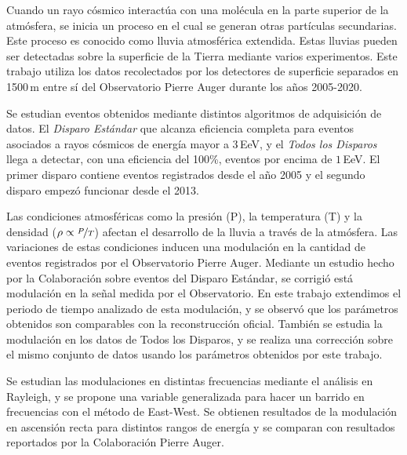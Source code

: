 \begin{resumen}%
Cuando un rayo cósmico interactúa con una molécula en la parte superior de la atmósfera, se inicia un proceso en el cual se generan otras partículas secundarias. Este proceso es conocido como lluvia atmosférica extendida. Estas lluvias pueden ser detectadas sobre la superficie de la Tierra mediante varios experimentos. Este trabajo utiliza los datos recolectados por los detectores de superficie separados en 1500\,m entre sí del Observatorio Pierre Auger durante los años 2005-2020. 

Se estudian eventos obtenidos mediante distintos algoritmos de adquisición de datos. El \emph{Disparo Estándar} que alcanza eficiencia completa para eventos asociados a rayos cósmicos de energía mayor a $3\,$EeV, y el \emph{Todos los Disparos} llega a detectar, con una eficiencia del 100\%, eventos por encima de $1\,$EeV. El primer disparo contiene eventos registrados desde el año 2005 y el segundo disparo empezó funcionar desde el 2013. 

Las condiciones atmosféricas como la presión (P), la temperatura (T) y la densidad ($\rho \propto \nicefrac{P}{T}$) afectan el desarrollo de la lluvia a través de la atmósfera. Las variaciones de estas condiciones inducen una modulación en la cantidad de eventos registrados por el Observatorio Pierre Auger. Mediante un estudio hecho por la Colaboración sobre eventos del Disparo Estándar, se corrigió está modulación en la señal medida por el Observatorio. En este trabajo extendimos el periodo de tiempo analizado de esta modulación, y se observó que los parámetros obtenidos son comparables con la reconstrucción oficial. También se estudia la modulación en los datos de Todos los Disparos, y se realiza una corrección sobre el mismo conjunto de datos usando los parámetros obtenidos por este trabajo.

Se  estudian las modulaciones en distintas frecuencias mediante el análisis en Rayleigh, y se propone una variable generalizada para hacer un barrido en frecuencias con el método de East-West. Se obtienen resultados de la modulación en ascensión recta para distintos rangos de energía y se comparan con resultados reportados por la Colaboración Pierre Auger.





\end{resumen}


